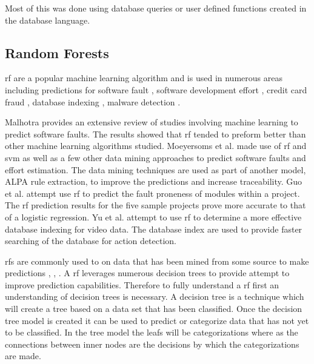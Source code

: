 
Most of this was done using database queries or user defined functions created in the database language.

\subsection{Random Forests}
\label{subsec:random_forest_predictions}

\gls{rf} are a popular machine learning algorithm and is used in numerous areas including predictions for software fault \cite{Malhotra2015, Moeyersoms2015, Guo2004}, software development effort \cite{Moeyersoms2015}, credit card fraud \cite{Westland2011}, database indexing \cite{Yu2011}, malware detection \cite{Alam2013}. 

Malhotra provides an extensive review of studies involving machine learning to predict software faults. The results showed that \gls{rf} tended to preform better than other machine learning algorithms studied. Moeyersoms et al. made use of \gls{rf} and \gls{svm} as well as a few other data mining approaches to predict software faults and effort estimation. The data mining techniques are used as part of another model, ALPA rule extraction, to improve the predictions and increase traceability. Guo et al. attempt use \gls{rf} to predict the fault proneness of modules within a project. The \gls{rf} prediction results for the five sample projects prove more accurate to that of a logistic regression. Yu et al. attempt to use \gls{rf} to determine a more effective database indexing for video data. The database index are used to provide faster searching of the database for action detection.

\gls{rf}s are commonly used to on data that has been mined from some source to make predictions \cite{Alam2013}, \cite{Granitto2007}, \cite{Yu2011}. A \gls{rf} leverages numerous decision trees to provide attempt to improve prediction capabilities. Therefore to fully understand a \gls{rf} first an understanding of decision trees is necessary. A decision tree is a technique which will create a tree based on a data set that has been classified. Once the decision tree model is created it can be used to predict or categorize data that has not yet to be classified. In the tree model the leafs will be categorizations where as the connections between inner nodes are the decisions by which the categorizations are made.

